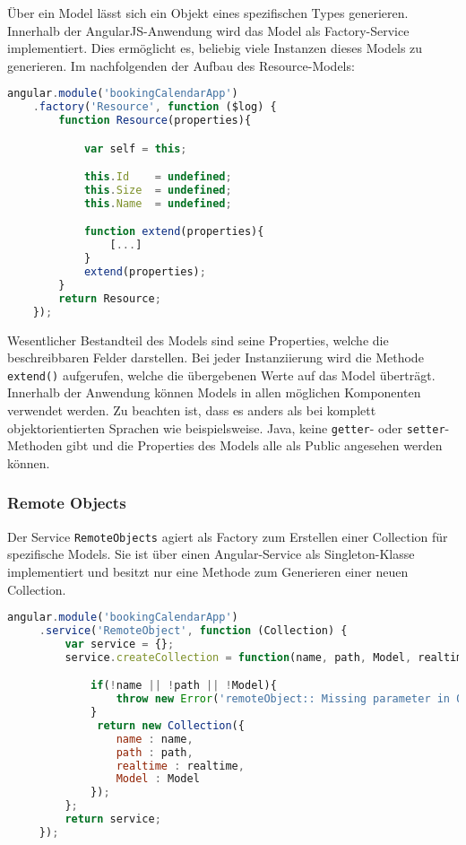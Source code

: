 Über ein Model lässt sich ein Objekt eines spezifischen Types generieren.
Innerhalb der AngularJS-Anwendung wird das Model als Factory-Service implementiert. Dies ermöglicht es, beliebig viele Instanzen dieses Models zu generieren.
Im nachfolgenden der Aufbau des Resource-Models:

\begin{lstlisting}[language=Javascript, label=code_ResourceModel, caption=Hauptteil des Resource-Models]
angular.module('bookingCalendarApp')
    .factory('Resource', function ($log) {
        function Resource(properties){

            var self = this;

            this.Id    = undefined;
            this.Size  = undefined;
            this.Name  = undefined;

            function extend(properties){
                [...]
            }
            extend(properties);
        }
        return Resource;
    });
\end{lstlisting}

Wesentlicher Bestandteil des Models sind seine Properties, welche die beschreibbaren Felder darstellen. Bei jeder Instanziierung wird die Methode \texttt{extend()} aufgerufen, welche die übergebenen Werte auf das Model überträgt.
Innerhalb der Anwendung können Models in allen möglichen Komponenten verwendet werden. Zu beachten ist, dass es anders als bei komplett objektorientierten Sprachen wie beispielsweise. Java, keine \texttt{getter}- oder \texttt{setter}-Methoden gibt und die Properties des Models alle als Public angesehen werden können.

\subsubsection{Remote Objects}
Der Service \texttt{RemoteObjects} agiert als Factory zum Erstellen einer Collection für spezifische Models. Sie ist über einen Angular-Service als Singleton-Klasse implementiert und besitzt nur eine Methode zum Generieren einer neuen Collection.

 \begin{lstlisting}[language=Javascript, label=code_RemoteObject, caption=Code des RemoteObjects-Service]
 angular.module('bookingCalendarApp')
     .service('RemoteObject', function (Collection) {
         var service = {};
         service.createCollection = function(name, path, Model, realtime){

             if(!name || !path || !Model){
                 throw new Error('remoteObject:: Missing parameter in Object')
             }
              return new Collection({
                 name : name,
                 path : path,
                 realtime : realtime,
                 Model : Model
             });
         };
         return service;
     });
\end{lstlisting}

